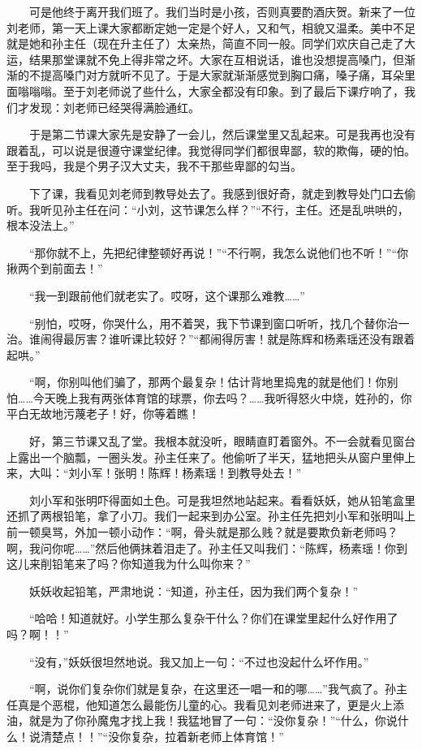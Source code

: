  　　可是他终于离开我们班了。我们当时是小孩，否则真要酌酒庆贺。新来了一位刘老师，第一天上课大家都断定她一定是个好人，又和气，相貌又温柔。美中不足就是她和孙主任（现在升主任了）太亲热，简直不同一般。同学们欢庆自己走了大运，结果那堂课就不免上得非常之坏。大家在互相说话，谁也没想提高嗓门，但渐渐的不提高嗓门对方就听不见了。于是大家就渐渐感觉到胸口痛，嗓子痛，耳朵里面嗡嗡嗡。至于刘老师说了些什么，大家全都没有印象。到了最后下课疗响了，我们才发现：刘老师已经哭得满脸通红。 
 
 　　于是第二节课大家先是安静了一会儿，然后课堂里又乱起来。可是我再也没有跟着乱，可以说是很遵守课堂纪律。我觉得同学们都很卑鄙，软的欺侮，硬的怕。至于我吗，我是个男子汉大丈夫，我不干那些卑鄙的勾当。 
 
 　　下了课，我看见刘老师到教导处去了。我感到很好奇，就走到教导处门口去偷听。我听见孙主任在问：“小刘，这节课怎么样？”“不行，主任。还是乱哄哄的，根本没法上。” 
 
 　　“那你就不上，先把纪律整顿好再说！”“不行啊，我怎么说他们也不听！”“你揪两个到前面去！” 
 
 　　“我一到跟前他们就老实了。哎呀，这个课那么难教……” 
 
 　　“别怕，哎呀，你哭什么，用不着哭，我下节课到窗口听听，找几个替你治一治。谁闹得最厉害？谁听课比较好？”“都闹得厉害！就是陈辉和杨素瑶还没有跟着起哄。” 
 
 　　“啊，你别叫他们骗了，那两个最复杂！估计背地里捣鬼的就是他们！你别怕……今天晚上我有两张体育馆的球票，你去吗？……我听得怒火中烧，姓孙的，你平白无故地污蔑老子！好，你等着瞧！ 
 
 　　好，第三节课又乱了堂。我根本就没听，眼睛直盯着窗外。不一会就看见窗台上露出一个脑瓢，一圈头发。孙主任来了。他偷听了半天，猛地把头从窗户里伸上来，大叫：“刘小军！张明！陈辉！杨素瑶！到教导处去！” 
 
 　　刘小军和张明吓得面如土色。可是我坦然地站起来。看看妖妖，她从铅笔盒里还抓了两根铅笔，拿了小刀。我们一起来到办公室。孙主任先把刘小军和张明叫上前一顿臭骂，外加一顿小动作：“啊，骨头就是那么贱？就是要欺负新老师吗？啊，我问你呢……”然后他俩抹着泪走了。孙主任又叫我们：“陈辉，杨素瑶！你到这儿来削铅笔来了吗？你知道我为什么叫你来？” 
 
 　　妖妖收起铅笔，严肃地说：“知道，孙主任，因为我们两个复杂！” 
 
 　　“哈哈！知道就好。小学生那么复杂干什么？你们在课堂里起什么好作用了吗？啊！！” 
 
 　　“没有，”妖妖很坦然地说。我又加上一句：“不过也没起什么坏作用。” 
 
 　　“啊，说你们复杂你们就是复杂，在这里还一唱一和的哪……”我气疯了。孙主任真是个恶棍，他知道怎么最能伤儿童的心。我看见刘老师进来了，更是火上添油，就是为了你孙魔鬼才找上我！我猛地冒了一句：“没你复杂！”“什么，你说什么！说清楚点！！”“没你复杂，拉着新老师上体育馆！” 
 
